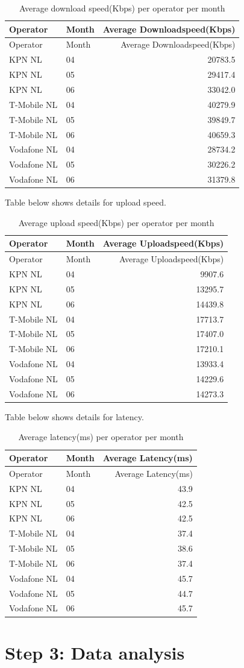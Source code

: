 \documentclass[]{article}
\begin{document}
\begin{longtable}[c]{@{}llr@{}}
\caption{Average download speed(Kbps) per operator per
month}\tabularnewline
\toprule
Operator & Month & Average Downloadspeed(Kbps)\tabularnewline
\midrule
\endfirsthead
\toprule
Operator & Month & Average Downloadspeed(Kbps)\tabularnewline
\midrule
\endhead
KPN NL & 04 & 20783.5\tabularnewline
KPN NL & 05 & 29417.4\tabularnewline
KPN NL & 06 & 33042.0\tabularnewline
T-Mobile NL & 04 & 40279.9\tabularnewline
T-Mobile NL & 05 & 39849.7\tabularnewline
T-Mobile NL & 06 & 40659.3\tabularnewline
Vodafone NL & 04 & 28734.2\tabularnewline
Vodafone NL & 05 & 30226.2\tabularnewline
Vodafone NL & 06 & 31379.8\tabularnewline
\bottomrule
\end{longtable}

Table below shows details for upload speed.

\begin{longtable}[c]{@{}llr@{}}
\caption{Average upload speed(Kbps) per operator per
month}\tabularnewline
\toprule
Operator & Month & Average Uploadspeed(Kbps)\tabularnewline
\midrule
\endfirsthead
\toprule
Operator & Month & Average Uploadspeed(Kbps)\tabularnewline
\midrule
\endhead
KPN NL & 04 & 9907.6\tabularnewline
KPN NL & 05 & 13295.7\tabularnewline
KPN NL & 06 & 14439.8\tabularnewline
T-Mobile NL & 04 & 17713.7\tabularnewline
T-Mobile NL & 05 & 17407.0\tabularnewline
T-Mobile NL & 06 & 17210.1\tabularnewline
Vodafone NL & 04 & 13933.4\tabularnewline
Vodafone NL & 05 & 14229.6\tabularnewline
Vodafone NL & 06 & 14273.3\tabularnewline
\bottomrule
\end{longtable}

Table below shows details for latency.

\begin{longtable}[c]{@{}llr@{}}
\caption{Average latency(ms) per operator per month}\tabularnewline
\toprule
Operator & Month & Average Latency(ms)\tabularnewline
\midrule
\endfirsthead
\toprule
Operator & Month & Average Latency(ms)\tabularnewline
\midrule
\endhead
KPN NL & 04 & 43.9\tabularnewline
KPN NL & 05 & 42.5\tabularnewline
KPN NL & 06 & 42.5\tabularnewline
T-Mobile NL & 04 & 37.4\tabularnewline
T-Mobile NL & 05 & 38.6\tabularnewline
T-Mobile NL & 06 & 37.4\tabularnewline
Vodafone NL & 04 & 45.7\tabularnewline
Vodafone NL & 05 & 44.7\tabularnewline
Vodafone NL & 06 & 45.7\tabularnewline
\bottomrule
\end{longtable}

\newpage

\section{Step 3: Data analysis}\label{step-3-data-analysis}
\end{document}
